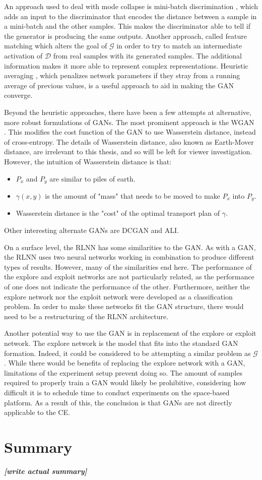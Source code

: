 	\par An approach used to deal with mode collapse is mini-batch discrimination \cite{placeholderCitation}, which adds an input to the discriminator that encodes the distance between a sample in a mini-batch and the other samples. This makes the discriminator able to tell if the generator is producing the same outputs. Another approach, called feature matching \cite{placeholderCitation} which alters the goal of $\mathcal{G}$ in order to try to match an intermediate activation of $\mathcal{D}$ from real samples with its generated samples. The additional information makes it more able to represent complex representations. Heuristic averaging \cite{placeholderCitation}, which penalizes network parameters if they stray from a running average of previous values, is a useful approach to aid in making the GAN converge. 
	\par Beyond the heuristic approaches, there have been a few attempts at alternative, more robust formulations of GANs. The most prominent approach is the WGAN \cite{bg:wganPaper}. This modifies the cost function of the GAN to use Wasserstein distance, instead of cross-entropy. The details of Wasserstein distance, also known as Earth-Mover distance, are irrelevant to this thesis, and so will be left for viewer investigation. However, the intuition of Wasserstein distance is that:  
	\begin{itemize}
		\item $P_x$ and $P_y$ are similar to piles of earth. 
		\item $\gamma(x,y)$ is the amount of "mass" that needs to be moved to make $P_x$ into $P_y$.
		\item Wasserstein distance is the "cost" of the optimal transport plan of $\gamma$.
	\end{itemize}
	Other interesting alternate GANs are DCGAN \cite{placeholderCitation} and ALI\cite{placeholderCitation}.
	\par On a surface level, the RLNN has some similarities to the GAN. As with a GAN, the RLNN uses two neural networks working in combination to produce different types of results. However, many of the similarities end here. The performance of the explore and exploit networks are not particularly related, as the performance of one does not indicate the performance of the other. Furthermore, neither the explore network nor the exploit network were developed as a classification problem. In order to make these networks fit the GAN structure, there would need to be a restructuring of the RLNN architecture.
	\par Another potential way to use the GAN is in replacement of the explore or exploit network. The explore network is the model that fits into the standard GAN formation. Indeed, it could be considered to be attempting a similar problem as $\mathcal{G}$. While there would be benefits of replacing the explore network with a GAN, limitations of the experiment setup prevent doing so. The amount of samples required to properly train a GAN would likely be prohibitive, considering how difficult it is to schedule time to conduct experiments on the space-based platform. As a result of this, the conclusion is that GANs are not directly applicable to the CE.
	
	\section{Summary}
	\par \textbf{\textit{[write actual summary]}}
%